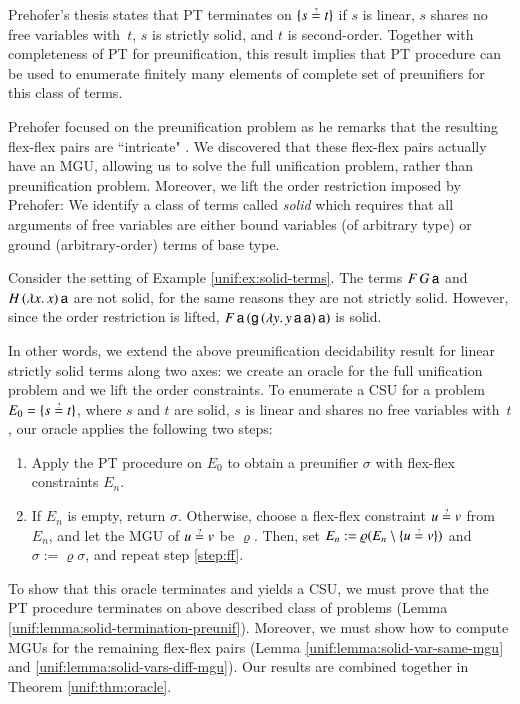 Prehofer's thesis states that PT terminates on $\{s \unif t\}$
if $s$ is linear, $s$ shares no free variables with~$t$, $s$ is strictly solid,
and $t$ is second-order. Together with completeness of PT for preunification,
this result implies that PT procedure can be used to enumerate finitely many
elements of complete set of preunifiers for this class of terms.

Prehofer focused on the preunification problem as he remarks that the resulting
flex-flex pairs are ``intricate" \cite[Sect.~5.2.2]{cp-95-unifphd}. We discovered that these flex-flex
pairs actually have an MGU, allowing us to solve the full unification problem,
rather than preunification problem. Moreover, we lift the order restriction
imposed by Prehofer: We identify a class of terms called \emph{solid} which
requires that all arguments of free variables are either bound variables (of
arbitrary type) or ground (arbitrary-order) terms of base type.

\begin{exa}
  Consider the setting of Example \ref{unif:ex:solid-terms}. The terms $F \, G \,
  \mathsf{a}$ and $H \, (\lambda x. \, x) \, \mathsf{a}$ are not solid, for the same reasons they are not strictly solid.
  However, since the order restriction is lifted, $F \, \mathsf{a} \, (\mathsf{g} \, (\lambda y. \,
  y\,\mathsf{a}\,\mathsf{a})  \, \mathsf{a})$ is solid.
\end{exa}


In other words, we extend the above preunification decidability result
for linear strictly solid terms along two axes: we create an oracle
for the full unification problem and we lift the
order constraints.
%
To enumerate a CSU for a problem $E_0 = \{s \unif t\}$, where $s$ and $t$ are solid,
$s$ is linear and shares no free variables with~$t$, our oracle applies the following two steps:
\begin{enumerate}
  \item Apply the PT procedure on $E_0$ to obtain a preunifier $\sigma$ with
  flex-flex constraints $E_n$.
  \item\label{step:ff} If $E_n$ is empty, return $\sigma$. Otherwise, choose a flex-flex constraint $u \unif v$ from $E_n$, and let the MGU of $u \unif v$
  be $\varrho$. Then, set $E_n := \varrho(E_n \setminus \{ u \unif v \})$ and
   $\sigma := \varrho\sigma$, and repeat step \ref{step:ff}.
\end{enumerate}

To show that this oracle terminates and yields a CSU, we must prove that the PT
procedure terminates on above described class of problems (Lemma
\ref{unif:lemma:solid-termination-preunif}). Moreover, we must show how to compute MGUs for
the remaining flex-flex pairs (Lemma \ref{unif:lemma:solid-var-same-mgu} and
\ref{unif:lemma:solid-vars-diff-mgu}). Our results are combined together in Theorem
\ref{unif:thm:oracle}.



